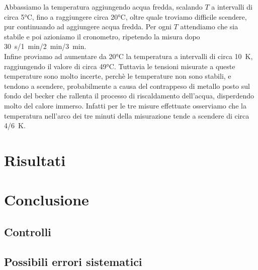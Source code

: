 \documentclass[italian, a4paper, 10pt, twocolumn]{../../style/lab_unige}
\begin{document}
    
    
    Abbassiamo la temperatura aggiungendo acqua fredda, scalando $T$ a intervalli di circa 5°C, fino a raggiungere circa 20°C, oltre quale troviamo difficile scendere, pur continuando ad aggiungere acqua fredda. Per ogni $T$ attendiamo che sia stabile e poi azioniamo il cronometro, ripetendo la misura dopo 30~s/1~min/2~min/3~min.\\
    Infine proviamo ad aumentare da 20°C la temperatura a intervalli di circa 10~K, raggiungendo il valore di circa 49°C. Tuttavia le tensioni misurate a queste temperature sono molto incerte, perchè le temperature non sono stabili, e tendono a scendere, probabilmente a causa del contrappeso di metallo posto sul fondo del becker che rallenta il processo di riscaldamento dell'acqua, disperdendo molto del calore immerso. Infatti per le tre misure effettuate osserviamo che la temperatura nell'arco dei tre minuti della misurazione tende a scendere di circa 4/6~K.



    \section{Risultati}
    \label{section:results}

    \section{Conclusione}
    \label{section:conclusion}

    \subsection{Controlli}

    \subsection{Possibili errori sistematici}



    
\end{document}
